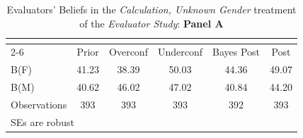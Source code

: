 \begin{table}[htbp]\centering
\caption{Evaluators' Beliefs in the \textit{Calculation, Unknown Gender} treatment of the \textit{Evaluator Study}: \textbf{Panel A}}
\begin{tabular}{l*{5}{c}}
\hline\hline
                &\multicolumn{5}{c}{}                             \\\cmidrule(lr){2-6}
                &\multicolumn{1}{c}{Prior}&\multicolumn{1}{c}{Overconf}&\multicolumn{1}{c}{Underconf}&\multicolumn{1}{c}{Bayes Post}&\multicolumn{1}{c}{Post}\\
\hline
B(F)            &    41.23&    38.39&    50.03&    44.36&    49.07\\
B(M)            &    40.62&    46.02&    47.02&    40.84&    44.20\\
\hline
Observations    &      393&      393&      393&      392&      393\\
\hline\hline
\multicolumn{6}{l}{\footnotesize SEs are robust}\\
\end{tabular}
\end{table}
